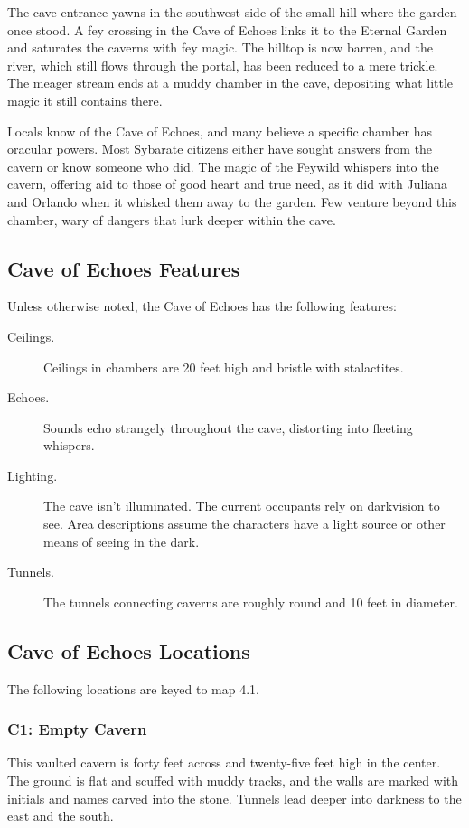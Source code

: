 \documentclass[10pt,a4paper,twoside,bg=print,twocolumn,openany,nodeprecatedcode]{dndbook}
\begin{document}
The cave entrance yawns in the southwest side of the small hill where the garden once stood. A fey crossing in the Cave of Echoes links it to the Eternal Garden and saturates the caverns with fey magic. The hilltop is now barren, and the river, which still flows through the portal, has been reduced to a mere trickle. The meager stream ends at a muddy chamber in the cave, depositing what little magic it still contains there.

Locals know of the Cave of Echoes, and many believe a specific chamber has oracular powers. Most Sybarate citizens either have sought answers from the cavern or know someone who did. The magic of the Feywild whispers into the cavern, offering aid to those of good heart and true need, as it did with Juliana and Orlando when it whisked them away to the garden. Few venture beyond this chamber, wary of dangers that lurk deeper within the cave.

\subsection{Cave of Echoes Features}
Unless otherwise noted, the Cave of Echoes has the following features:


\begin{description}
\item[Ceilings.]
Ceilings in chambers are 20 feet high and bristle with stalactites.
\item[Echoes.]
Sounds echo strangely throughout the cave, distorting into fleeting whispers.
\item[Lighting.]
The cave isn't illuminated. The current occupants rely on darkvision to see. Area descriptions assume the characters have a light source or other means of seeing in the dark.
\item[Tunnels.]
The tunnels connecting caverns are roughly round and 10 feet in diameter.
\end{description}

\subsection{Cave of Echoes Locations}
The following locations are keyed to map 4.1.

\subsubsection{C1: Empty Cavern}
\begin{DndReadAloud}{}
This vaulted cavern is forty feet across and twenty-five feet high in the center. The ground is flat and scuffed with muddy tracks, and the walls are marked with initials and names carved into the stone. Tunnels lead deeper into darkness to the east and the south.

\end{DndReadAloud}
\end{document}
